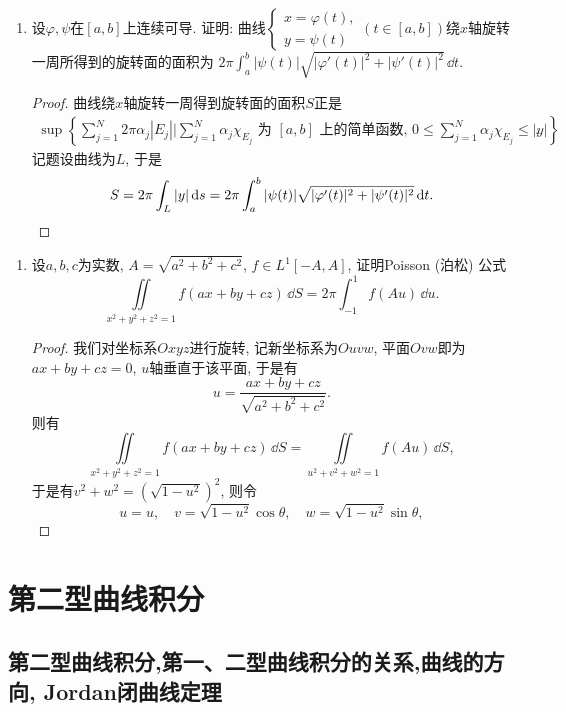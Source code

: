 \begin{quiza}
\begin{enumerate}
\item 设\(\varphi,\psi\)在\([a,b]\)上连续可导. 证明: 曲线\(\begin{cases}
x=\varphi(t),\\y=\psi(t)
\end{cases}(t\in[a,b])\)绕\(x\)轴旋转一周所得到的旋转面的面积为
\(2\pi\int_{a}^{b}|\psi(t)|\sqrt{|\varphi'(t)|^2+|\psi'(t)|^2}\,\dd t\).

\begin{proof}
曲线绕\(x\)轴旋转一周得到旋转面的面积\(S\)正是\[\begin{split}
\sup\left\lbrace\sum_{j=1}^{N}2\pi \alpha_j\left|E_j\right|\Big|
\sum_{j=1}^{N}\alpha_j\chi_{E_j}\text{ 为 }[a,b]\text{ 上的简单函数, }
0\leqslant\sum_{j=1}^{N}\alpha_j\chi_{E_j}\leqslant|y|\right\rbrace,
\end{split}\]记题设曲线为\(L\), 于是\[S=2\pi\int_L|y|\,\mathrm{d} s
=2\pi\int_{a}^{b}|\psi(t)|\sqrt{|\varphi'(t)|^2+|\psi'(t)|^2}\,\mathrm{d} t.\qedhere\]
\end{proof}
\end{enumerate}
\end{quiza}

\begin{quizb}
\begin{enumerate}
\item 设\(a,b,c\)为实数, \(A=\sqrt{a^2+b^2+c^2}\), \(f\in L^1[-A,A]\), 
证明Poisson (泊松) 公式\[\iint\limits_{x^2+y^2+z^2=1}f(ax+by+cz)\,\dd S
=2\pi\int_{-1}^{1}f(Au)\,\dd u.\]
\begin{proof}
我们对坐标系\(Oxyz\)进行旋转, 记新坐标系为\(Ouvw\), 
平面\(Ovw\)即为\(ax+by+cz=0\), \(u\)轴垂直于该平面, 
于是有 \[u=\frac{ax+by+cz}{\sqrt{a^2+b^2+c^2}}.\]
则有\[\iint\limits_{x^2+y^2+z^2=1}f(ax+by+cz)\,\dd S
=\iint\limits_{u^2+v^2+w^2=1}f(Au)\,\dd S,\]
于是有\(v^2+w^2=\left(\sqrt{1-u^2}\right)^2\), 则令
\[u=u,\quad v=\sqrt{1-u^2}\cos\theta,\quad w=\sqrt{1-u^2}\sin\theta,\]
\end{proof}
\end{enumerate}
\end{quizb}
\section{第二型曲线积分}
\subsection{第二型曲线积分,第一、二型曲线积分的关系,曲线的方向, Jordan闭曲线定理}

